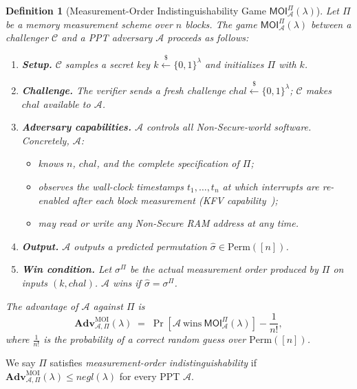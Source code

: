 \documentclass{ieeeaccess}
\newtheorem{definition}{Definition}
\newcommand{\Adv}{\mathbf{Adv}}
\begin{document}
\begin{definition}[Measurement-Order Indistinguishability Game
  $\mathsf{MOI}^{\Pi}_{\mathcal{A}}(\lambda)$]
\label{def:moi-game}
Let $\Pi$ be a memory measurement scheme over $n$ blocks.
The game $\mathsf{MOI}^{\Pi}_{\mathcal{A}}(\lambda)$ between a challenger
$\mathcal{C}$ and a PPT adversary $\mathcal{A}$ proceeds as follows:
\begin{enumerate}
  \item \textbf{Setup.}
    $\mathcal{C}$ samples a secret key
    $k \xleftarrow{\$} \{0,1\}^{\lambda}$ and initializes $\Pi$ with $k$.
  \item \textbf{Challenge.}
    The verifier sends a fresh challenge
    $\mathit{chal} \xleftarrow{\$} \{0,1\}^{\lambda}$;
    $\mathcal{C}$ makes $\mathit{chal}$ available to $\mathcal{A}$.
  \item \textbf{Adversary capabilities.}
    $\mathcal{A}$ controls all Non-Secure-world software.
    Concretely, $\mathcal{A}$:
    \begin{itemize}
      \item knows $n$, $\mathit{chal}$, and the complete specification of $\Pi$;
      \item observes the wall-clock timestamps $t_1,\dots,t_n$ at which interrupts are re-enabled after each block measurement (KFV capability~\cite{smarm});
      \item may read or write any Non-Secure RAM address at any time.
    \end{itemize}
  \item \textbf{Output.}
    $\mathcal{A}$ outputs a predicted permutation
    $\hat{\sigma} \in \mathrm{Perm}([n])$.
  \item \textbf{Win condition.}
    Let $\sigma^{\Pi}$ be the actual measurement order produced by $\Pi$
    on inputs $(k, \mathit{chal})$.
    $\mathcal{A}$ wins if $\hat{\sigma} = \sigma^{\Pi}$.
\end{enumerate}
The advantage of $\mathcal{A}$ against $\Pi$ is
\[
  \Adv^{\mathrm{MOI}}_{\mathcal{A},\Pi}(\lambda)
  \;=\; \Pr\!\left[\mathcal{A}\ \text{wins}\ \mathsf{MOI}^{\Pi}_{\mathcal{A}}(\lambda)\right]
  - \frac{1}{n!},
\]
where $\frac{1}{n!}$ is the probability of a correct random guess over
$\mathrm{Perm}([n])$.
\end{definition}
 
We say $\Pi$ satisfies \emph{measurement-order indistinguishability} if
$\Adv^{\mathrm{MOI}}_{\mathcal{A},\Pi}(\lambda) \leq \mathit{negl}(\lambda)$
for every PPT $\mathcal{A}$.
 
\end{document}
